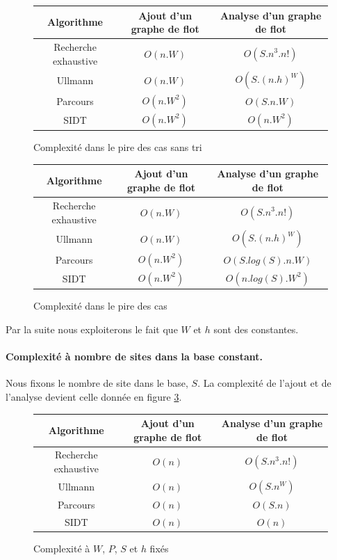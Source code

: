 \begin{figure}[h]
\begin{center}
\begin{tabular}{|c|c|c|}
 \hline
 Algorithme & Ajout d'un graphe de flot & Analyse d'un graphe de flot\\
 \hline
 Recherche exhaustive & $O(n.W)$ & $O(S.n^3.n!)$\\
 Ullmann & $O(n.W)$ & $O(S.(n.h)^W)$ \\
 Parcours & $O(n.W^2)$ & $O(S.n.W)$\\
 SIDT & $O(n.W^2)$ & $O(n.W^2)$\\
 \hline
\end{tabular} 
\end{center}
\caption{Complexité dans le pire des cas sans tri}
\label{fig:complexite_1}
\end{figure}

\begin{figure}[h]
\begin{center}
\begin{tabular}{|c|c|c|}
 \hline
 Algorithme & Ajout d'un graphe de flot & Analyse d'un graphe de flot\\
 \hline
 Recherche exhaustive & $O(n.W)$ & $O(S.n^3.n!)$\\
 Ullmann & $O(n.W)$ & $O(S.(n.h)^W)$ \\
 Parcours & $O(n.W^2)$ & $O(S.log(S).n.W)$\\
 SIDT & $O(n.W^2)$ & $O(n.log(S).W^2)$\\
 \hline
\end{tabular} 
\end{center}
\caption{Complexité dans le pire des cas}
\label{fig:complexite_1}
\end{figure}

Par la suite nous exploiterons le fait que $W$ et $h$ sont des constantes.

\paragraph{Complexité à nombre de sites dans la base constant.}
Nous fixons le nombre de site dans le base, $S$.
La complexité de l'ajout et de l'analyse devient celle donnée en figure \ref{fig:complexite_2}.

\begin{figure}[h]
\begin{center}
\begin{tabular}{|c|c|c|}
 \hline
 Algorithme & Ajout d'un graphe de flot & Analyse d'un graphe de flot\\
 \hline
 Recherche exhaustive & $O(n)$ & $O(S.n^3.n!)$\\
 Ullmann & $O(n)$ & $O(S.n^W)$ \\
 Parcours & $O(n)$ & $O(S.n)$\\
 SIDT & $O(n)$ & $O(n)$\\
 \hline
\end{tabular} 
\end{center}
\caption{Complexité à $W$, $P$, $S$ et $h$ fixés}
\label{fig:complexite_2}
\end{figure}

